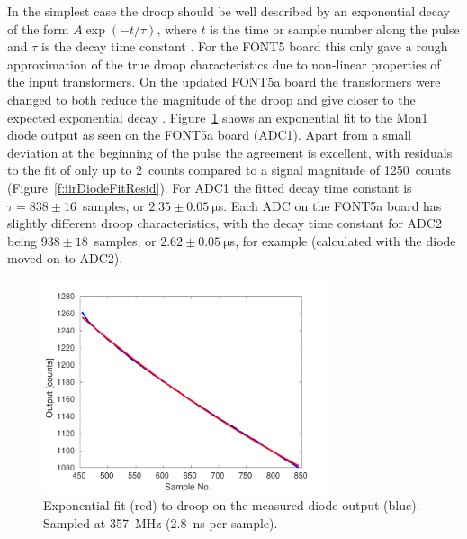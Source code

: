 In the simplest case the droop should be well described by an exponential decay of the form \(A\exp\left(-t/\tau\right)\), where \(t\) is the time or sample number along the pulse and \(\tau\) is the decay time constant \cite{colinPriv}. For the FONT5 board this only gave a rough approximation of the true droop characteristics due to non-linear properties of the input transformers. On the updated FONT5a board the transformers were changed to both reduce the magnitude of the droop and give closer to the expected exponential decay \cite{colinPriv}. Figure~\ref{f:iirDiodeFit} shows an exponential fit to the Mon1 diode output as seen on the FONT5a board (ADC1). Apart from a small deviation at the beginning of the pulse the agreement is excellent, with residuals to the fit of only up to 2~counts compared to a signal magnitude of 1250~counts (Figure~\ref{f:iirDiodeFitResid}). For ADC1 the fitted decay time constant is \(\tau = 838\pm16\)~samples, or \(2.35\pm0.05~\mathrm{\mu}\)s. Each ADC on the FONT5a board has slightly different droop characteristics, with the decay time constant for ADC2 being \(938\pm18\)~samples, or \(2.62\pm0.05~\mathrm{\mu}\)s, for example (calculated with the diode moved on to ADC2).

\begin{figure}
  \centering
  \includegraphics[width=0.75\textwidth]{Figures/commissioning/iirDiodeFit}
  \caption{Exponential fit (red) to droop on the measured diode output (blue). Sampled at 357~MHz (2.8~ns per sample).}
  \label{f:iirDiodeFit}
\end{figure}

